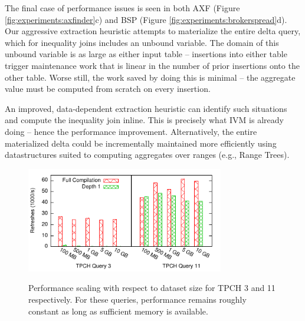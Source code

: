 The final case of performance issues is seen in both AXF (Figure \ref{fig:experiments:axfinder}c) and BSP (Figure \ref{fig:experiments:brokerspread}d).  Our aggressive extraction heuristic attempts to materialize the entire delta query, which for inequality joins includes an unbound variable.
The domain of this unbound variable is as large as either input table -- insertions into either table trigger maintenance work that is linear in the number of prior insertions onto the other table.
Worse still, the work saved by doing this is minimal -- the aggregate value must be computed from scratch on every insertion.

An improved, data-dependent extraction heuristic can identify such situations and compute the inequality join inline.  This is precisely what IVM is already doing -- hence the performance improvement.  Alternatively, the entire materialized delta could be incrementally maintained more efficiently using datastructures suited to computing aggregates over ranges (e.g., Range Trees\cite{rangequeries}).


\begin{figure}
\begin{center}
\includegraphics[width=3.4in]{../graphs/graphs/scaling.pdf} \\
\vspace{-3mm}
\caption{Performance scaling with respect to dataset size for TPCH 3 and 11 respectively.  For these queries, performance remains roughly constant as long as sufficient memory is available.}
\label{fig:experiments:big}

\end{center}\vspace*{-0.3in}
\end{figure}



